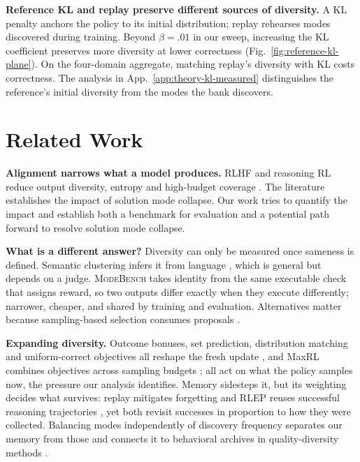 \documentclass{article}
\newcommand{\1}{\mathbf 1}
\newcommand{\mb}{\textsc{ModeBench}}
\theoremstyle{remark}
\theoremstyle{definition}
\theoremstyle{plain}
\begin{document}
\textbf{Reference KL and replay preserve different sources of diversity.}
A KL penalty anchors the policy to its initial distribution; replay rehearses modes discovered during training. Beyond $\beta=.01$ in our sweep, increasing the KL coefficient preserves more diversity at lower correctness (Fig.~\ref{fig:reference-kl-plane}). On the four-domain aggregate, matching replay's diversity with KL costs correctness. The analysis in App.~\ref{app:theory-kl-measured} distinguishes the reference's initial diversity from the modes the bank discovers.

\section{Related Work}
\label{sec:related}

\textbf{Alignment narrows what a model produces.} RLHF and reasoning RL reduce
output diversity, entropy and high-budget coverage
\citep{kirk2024understanding,dang2025diversity,cui2025entropy,yue2025rlvrlimit}.
The literature establishes the impact of solution mode collapse. Our work tries to quantify the impact and establish both a benchmark for evaluation and a potential path forward to resolve solution mode collapse.

\textbf{What is a different answer?}
Diversity can only be measured once sameness is defined.
Semantic clustering infers it from language \citep{farquhar2024detecting}, which is general but depends on a judge.
\mb{} takes identity from the same executable check that assigns reward, so two outputs differ exactly when they execute differently; narrower, cheaper, and shared by training and evaluation.
Alternatives matter because sampling-based selection consumes proposals
\citep{brown2024monkeys,snell2024testtime,cobbe2021training,lightman2023lets}.

\textbf{Expanding diversity.}
Outcome bonuses, set prediction, distribution matching and uniform-correct objectives all reshape the fresh update \citep{song2025outcome,chen2025passktraining,li2025divergence,li2026setpo,li2026distribution,lochab2026ucpo}, and MaxRL combines objectives across sampling budgets \citep{tajwar2026maxrl};
all act on what the policy samples now, the pressure our analysis
identifies.
Memory sidesteps it, but its weighting decides what survives: replay mitigates forgetting \citep{lin1992selfimproving,rolnick2019replay} and RLEP reuses successful reasoning trajectories \citep{zhang2025rlep}, yet both revisit successes in proportion to how they were collected.
Balancing modes independently of discovery frequency separates our memory from those and connects it to behavioral archives in quality-diversity methods \citep{mouret2015illuminating,ecoffet2021return}.
\end{document}
